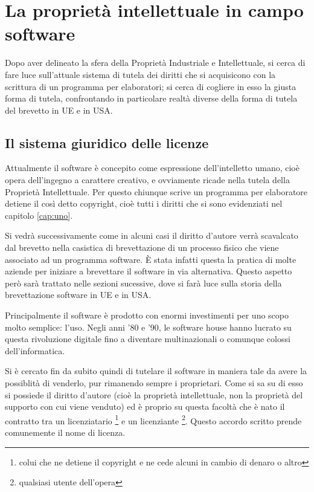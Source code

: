 \chapter{La proprietà intellettuale in campo software}
Dopo aver delineato la sfera della Proprietà Industriale e Intellettuale, si cerca di fare luce sull'attuale sistema di tutela dei diritti che si acquisicono con la scrittura di un programma per elaboratori; si cerca di cogliere in esso la giusta forma di tutela,  confrontando in particolare realtà diverse della forma di tutela del brevetto in UE e in USA.

\section{Il sistema giuridico delle licenze} \label{sec:sistema-licenze}
Attualmente il software è concepito come espressione dell'intelletto umano, cioè opera dell'ingegno a carattere creativo, e ovviamente ricade nella tutela della Proprietà Intellettuale. Per questo chiunque scrive un programma per elaboratore detiene il così detto copyright, cioè tutti i diritti che si sono evidenziati nel capitolo \ref{cap:uno}.

Si vedrà successivamente come in alcuni casi il diritto d'autore verrà scavalcato dal brevetto nella casistica di brevettazione di un processo fisico che viene associato ad un programma software. \`E stata infatti questa la pratica di molte aziende per iniziare a brevettare il software in via alternativa. Questo aspetto però sarà trattato nelle sezioni sucessive, dove si farà luce sulla storia della brevettazione software in UE e in USA.

Principalmente il software è prodotto con enormi investimenti per uno scopo molto semplice: l'uso. Negli anni '80 e '90, le software house hanno lucrato su questa rivoluzione digitale fino a diventare multinazionali o comunque colossi dell'informatica.

Si è cercato fin da subito quindi di tutelare il software in maniera tale da avere la possiblità di venderlo, pur rimanendo sempre i proprietari. Come si sa su di esso si possiede il diritto d'autore (cioè la proprietà intellettuale, non la proprietà del supporto con cui viene venduto) ed è proprio su questa facoltà che è nato il contratto tra un licenziatario \footnote{colui che ne detiene il copyright e ne cede alcuni in cambio di denaro o altro} e un licenziante \footnote{qualsiasi utente dell'opera}. Questo accordo scritto prende comunemente il nome di licenza.

